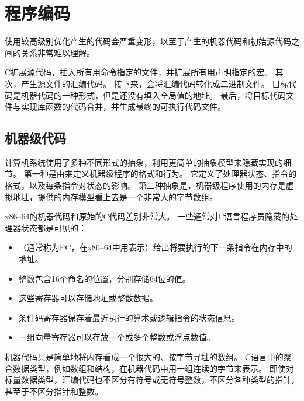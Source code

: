 
\section{程序编码}
{
    使用较高级别优化产生的代码会严重变形，以至于产生的机器代码和初始源代码之间的关系非常难以理解。

    C扩展源代码，插入所有用命令指定的文件，并扩展所有用声明指定的宏。
    其次，产生源文件的汇编代码。
    接下来，会将汇编代码转化成二进制文件。
    目标代码是机器代码的一种形式，但是还没有填入全局值的地址。
    最后，将目标代码文件与实现库函数的代码合并，并生成最终的可执行代码文件。

    \subsection{机器级代码}
    {
        计算机系统使用了多种不同形式的抽象，利用更简单的抽象模型来隐藏实现的细节。
        第一种是由来定义机器级程序的格式和行为。
        它定义了处理器状态、指令的格式，以及每条指令对状态的影响。
        第二种抽象是，机器级程序使用的内存是虚拟地址，提供的内存模型看上去是一个非常大的字节数组。

        x86--64的机器代码和原始的C代码差别非常大。
        一些通常对C语言程序员隐藏的处理器状态都是可见的：

        \begin{itemize}
            \item {}（通常称为PC，在x86--64中用表示）给出将要执行的下一条指令在内存中的地址。
            \item 整数包含16个命名的位置，分别存储64位的值。
            \item 这些寄存器可以存储地址或整数数据。
            \item 条件码寄存器保存着最近执行的算术或逻辑指令的状态信息。
            \item 一组向量寄存器可以存放一个或多个整数或浮点数值。
        \end{itemize}

        机器代码只是简单地将内存看成一个很大的、按字节寻址的数组。
        C语言中的聚合数据类型，例如数组和结构，在机器代码中用一组连续的字节来表示。
        即使对标量数据类型，汇编代码也不区分有符号或无符号整数，不区分各种类型的指针，甚至于不区分指针和整数。

}}
